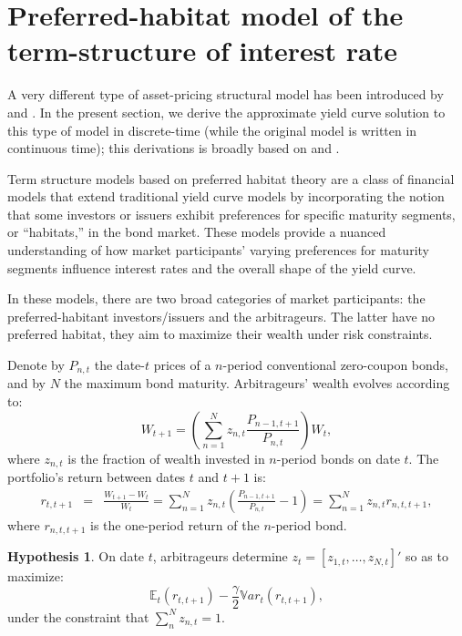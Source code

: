 \documentclass[
  12pt,
]{book}
\theoremstyle{definition}
\theoremstyle{definition}
\theoremstyle{definition}
\theoremstyle{definition}
\newtheorem{hypothesis}{Hypothesis}[chapter]
\theoremstyle{remark}
\begin{document}
\hypertarget{preferred-habitat-model-of-the-term-structure-of-interest-rate}{%
\section{Preferred-habitat model of the term-structure of interest rate}\label{preferred-habitat-model-of-the-term-structure-of-interest-rate}}

A very different type of asset-pricing structural model has been introduced by \citet{Greenwood_Vayanos_2014} and \citet{Vayanos_Vila_2021}. In the present section, we derive the approximate yield curve solution to this type of model in discrete-time (while the original model is written in continuous time); this derivations is broadly based on \citet{Hamilton_Wu_2012} and \citet{Hayashi_2018}.

Term structure models based on preferred habitat theory are a class of financial models that extend traditional yield curve models by incorporating the notion that some investors or issuers exhibit preferences for specific maturity segments, or ``habitats,'' in the bond market. These models provide a nuanced understanding of how market participants' varying preferences for maturity segments influence interest rates and the overall shape of the yield curve.

In these models, there are two broad categories of market participants: the preferred-habitant investors/issuers and the arbitrageurs. The latter have no preferred habitat, they aim to maximize their wealth under risk constraints.

Denote by \(P_{n,t}\) the date-\(t\) prices of a \(n\)-period conventional zero-coupon bonds, and by \(N\) the maximum bond maturity. Arbitrageurs' wealth evolves according to:
\[
W_{t+1} = \left(\sum_{n=1}^N z_{n,t}\frac{P_{n-1,t+1}}{P_{n,t}}\right)W_t,
\]
where \(z_{n,t}\) is the fraction of wealth invested in \(n\)-period bonds on date \(t\). The portfolio's return between dates \(t\) and \(t+1\) is:
\begin{eqnarray*}
r_{t,t+1} &=& \frac{W_{t+1}-W_t}{W_t}=
\sum_{n=1}^N z_{n,t}\left(\frac{P_{n-1,t+1}}{P_{n,t}}-1\right) = \sum_{n=1}^N z_{n,t}r_{n,t,t+1},
\end{eqnarray*}
where \(r_{n,t,t+1}\) is the one-period return of the \(n\)-period bond.

\begin{hypothesis}
\protect\hypertarget{hyp:prefArbit}{}\label{hyp:prefArbit}On date \(t\), arbitrageurs determine \(z_t=[z_{1,t},\dots,z_{N,t}]'\) so as to maximize:
\[
\mathbb{E}_t(r_{t,t+1}) - \frac{\gamma}{2}\mathbb{V}ar_t(r_{t,t+1}),
\]
under the constraint that \(\sum_n^N z_{n,t} = 1\).
\end{hypothesis}
\end{document}
